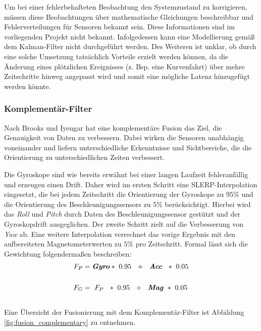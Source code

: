 Um bei einer fehlerbehafteten Beobachtung den Systemzustand zu korrigieren, müssen diese Beobachtungen über mathematische Gleichungen beschreibbar und Fehlerverteilungen für Sensoren bekannt sein.
Diese Informationen sind im vorliegenden Projekt nicht bekannt.
Infolgedessen kann eine Modellierung gemäß dem Kalman-Filter nicht durchgeführt werden. 
Des Weiteren ist unklar, ob durch eine solche Umsetzung tatsächlich Vorteile erzielt werden können, da die Änderung eines plötzlichen Ereignisses (z. Bsp. eine Kurvenfahrt) über mehre Zeitschritte hinweg angepasst wird und somit eine mögliche Latenz hinzugefügt werden könnte.

\subsubsection{Komplementär-Filter}
Nach Brooks und Iyengar \cite{Brooks.1998} hat eine komplementäre Fusion das Ziel, die Genauigkeit von Daten zu verbessern. 
Dabei wirken die Sensoren unabhängig voneinander und liefern unterschiedliche Erkenntnisse und Sichtbereiche, die die Orientierung zu unterschiedlichen Zeiten verbessert.

Die Gyroskope sind wie bereits erwähnt bei einer langen Laufzeit fehleranfällig und erzeugen einen Drift. 
Daher wird im ersten Schritt eine \ac{SLERP}-Interpolation eingesetzt, die bei jedem Zeitschritt die Orientierung der Gyroskope zu $95\%$ und die Orientierung des Beschleunigungssensors zu $5\%$ berücksichtigt.
Hierbei wird das \emph{Roll} und \emph{Pitch} durch Daten des Beschleunigungssensor gestützt und der Gyroskopdrift ausgeglichen.
Der zweite Schritt zielt auf die Verbesserung von \emph{Yaw} ab.
Eine weitere Interpolation verrechnet das vorige Ergebnis mit den aufbereiteten Magnetometerwerten zu $5\%$ pro Zeitschritt.
Formal lässt sich die Gewichtung folgendermaßen beschreiben:
\\
\begin{align}
F_P &= \textbf{\textit{Gyro}}*~0.95~~+~~\textbf{\textit{Acc}}~~*~0.05\\
\notag\\
F_G &= ~F_P~~*~0.95~~+~~\textbf{\textit{Mag}}~*~0.05
\end{align}
\\
Eine Übersicht der Fusionierung mit dem Komplementär-Filter ist Abbildung \ref{fig:fusion_complementary} zu entnehmen.

